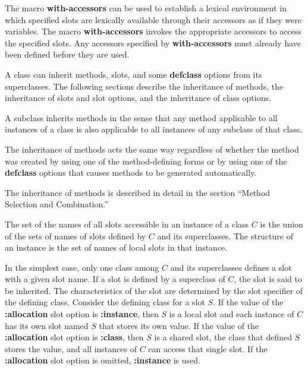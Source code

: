 The macro {\bf with-accessors} can be used to establish a lexical
environment in which specified slots are lexically available through
their accessors as if they were variables.  The macro {\bf
with-accessors} invokes the appropriate accessors to access the
specified slots. Any accessors specified by {\bf with-accessors} must
already have been defined before they are used.

\endsubSection%
\endSection%


A class can inherit methods, slots, and some {\bf defclass} options
from its superclasses.  The following sections describe the inheritance of
methods, the inheritance of slots and slot options, and the inheritance of
class options.
 

A subclass inherits methods in the sense that any method applicable to
all instances of a class is also applicable to all instances of any
subclass of that class.

The inheritance of methods acts the same way regardless of whether the
method was created by using one of the method-defining forms or by
using one of the {\bf defclass} options that causes methods to be
generated automatically.

The inheritance of methods is described in detail in the section
``Method Selection and Combination.''   

\endsubSection%


The set of the names of all slots accessible in an instance of a class
$C$ is the union of the sets of names of slots defined by $C$ and its
superclasses. The {\bit structure} of an instance is the set of names
of local slots in that instance.

In the simplest case, only one class among $C$ and its superclasses
defines a slot with a given slot name.  If a slot is defined by a
superclass of $C$\negthinspace, the slot is said to be {\bit
inherited}.  The characteristics of the slot are determined by the
slot specifier of the defining class.  Consider the defining class for
a slot $S$\negthinspace.  If the value of the {\bf :allocation} slot
option is {\bf :instance}, then $S$ is a local slot and each instance
of $C$ has its own slot named $S$ that stores its own value.  If the
value of the {\bf :allocation} slot option is {\bf :class}, then $S$
is a shared slot, the class that defined $S$ stores the value, and all
instances of $C$ can access that single slot.  If the {\bf
:allocation} slot option is omitted, {\bf :instance} is used.

